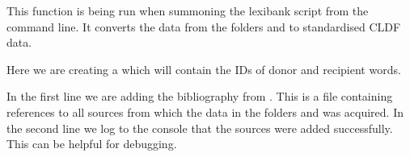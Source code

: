 \documentclass[letterpaper,10pt,english]{sphinxmanual}
\begin{document}
{{{{\begin{sphinxVerbatim}[commandchars=\\\{\}]
  
\end{sphinxVerbatim}

\sphinxAtStartPar
This function is being run when summoning the lexibank script from the
command line. It converts the data from the folders  and  to
standardised CLDF data.

\begin{sphinxVerbatim}[commandchars=\\\{\}]
\end{sphinxVerbatim}

\sphinxAtStartPar
Here we are creating a 
 which will contain the IDs of donor and recipient
words.

\begin{sphinxVerbatim}[commandchars=\\\{\}]
\end{sphinxVerbatim}

\sphinxAtStartPar
In the first line we are adding the bibliography from .
This is a  file containing
references to all sources from which the data in the folders  and
 was acquired. In the second line we log to the console
that the sources were added successfully. This can be helpful for debugging.

}}}}
\end{document}
